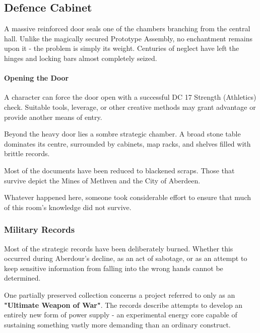 \subsection*{ Defence Cabinet}
{\entryfont A massive reinforced door seals one of the chambers branching from the central hall. Unlike the magically secured Prototype Assembly, no enchantment remains upon it - the problem is simply its weight. Centuries of neglect have left the hinges and locking bars almost completely seized.

\paragraph*{Opening the Door} A character can force the door open with a successful DC 17 Strength (Athletics) check. Suitable tools, leverage, or other creative methods may grant advantage or provide another means of entry.}
\begin{DndReadAloud}
	Beyond the heavy door lies a sombre strategic chamber. A broad stone table dominates its centre, surrounded by cabinets, map racks, and shelves filled with brittle records.

	Most of the documents have been reduced to blackened scraps. Those that survive depict the Mines of Methven and the City of Aberdeen.

	Whatever happened here, someone took considerable effort to ensure that much of this room's knowledge did not survive.
\end{DndReadAloud}
\subsubsection*{Military Records}
{\entryfont Most of the strategic records have been deliberately burned. Whether this occurred during Aberdour's decline, as an act of sabotage, or as an attempt to keep sensitive information from falling into the wrong hands cannot be determined.

One partially preserved collection concerns a project referred to only as an \textbf{"Ultimate Weapon of War"}. The records describe attempts to develop an entirely new form of power supply - an experimental energy core capable of sustaining something vastly more demanding than an ordinary construct.}